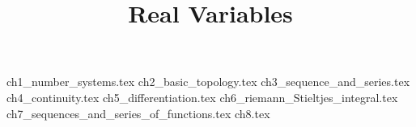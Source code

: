 \documentclass[]{report}
\title{Real Variables}
\begin{document}
\maketitle
{ch1_number_systems.tex}
{ch2_basic_topology.tex}
{ch3_sequence_and_series.tex}
{ch4_continuity.tex}
{ch5_differentiation.tex}
{ch6_riemann_Stieltjes_integral.tex}
{ch7_sequences_and_series_of_functions.tex}
{ch8.tex}
\end{document}
